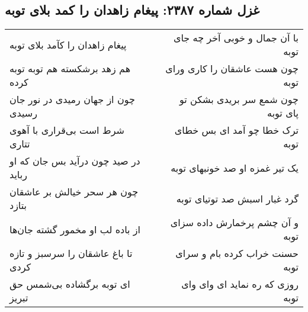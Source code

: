 \begin{center}
\section*{غزل شماره ۲۳۸۷: پیغام زاهدان را کمد بلای توبه}
\label{sec:2387}
\begin{longtable}{l p{0.5cm} r}
پیغام زاهدان را کآمد بلای توبه
&&
با آن جمال و خوبی آخر چه جای توبه
\\
هم زهد برشکسته هم توبه توبه کرده
&&
چون هست عاشقان را کاری ورای توبه
\\
چون از جهان رمیدی در نور جان رسیدی
&&
چون شمع سر بریدی بشکن تو پای توبه
\\
شرط است بی‌قراری با آهوی تتاری
&&
ترک خطا چو آمد ای بس خطای توبه
\\
در صید چون درآید بس جان که او رباید
&&
یک تیر غمزه او صد خونبهای توبه
\\
چون هر سحر خیالش بر عاشقان بتازد
&&
گرد غبار اسبش صد توتیای توبه
\\
از باده لب او مخمور گشته جان‌ها
&&
و آن چشم پرخمارش داده سزای توبه
\\
تا باغ عاشقان را سرسبز و تازه کردی
&&
حسنت خراب کرده بام و سرای توبه
\\
ای توبه برگشاده بی‌شمس حق تبریز
&&
روزی که ره نماید ای وای وای توبه
\\
\end{longtable}
\end{center}
